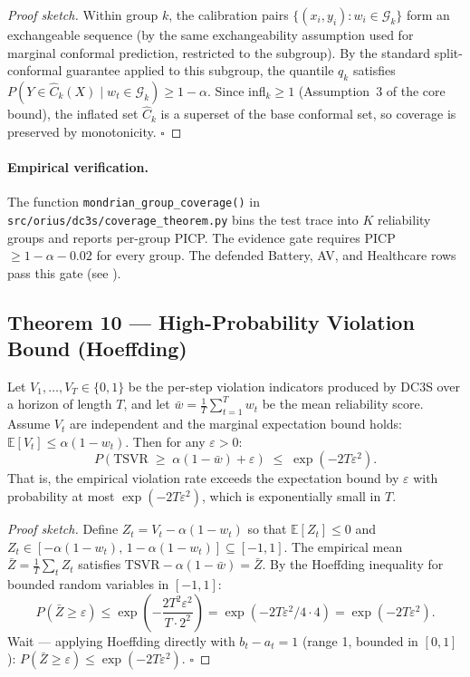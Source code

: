 \begin{proof}[Proof sketch]
Within group $k$, the calibration pairs $\{(x_i, y_i) : w_i \in \mathcal{G}_k\}$
form an exchangeable sequence (by the same exchangeability assumption used for
marginal conformal prediction, restricted to the subgroup).
By the standard split-conformal guarantee applied to this subgroup,
the quantile $q_k$ satisfies
$P(Y \in \hat{C}_k(X) \mid w_t \in \mathcal{G}_k) \geq 1 - \alpha$.
Since infl$_k \geq 1$ (Assumption~3 of the core bound), the inflated set
$\hat{C}_k$ is a superset of the base conformal set, so coverage is
preserved by monotonicity.  $\square$
\end{proof}

\paragraph{Empirical verification.}
The function \texttt{mondrian\_group\_coverage()} in
\texttt{src/orius/dc3s/coverage\_theorem.py} bins the test trace into $K$
reliability groups and reports per-group PICP.  The evidence gate requires
PICP $\geq 1 - \alpha - 0.02$ for every group.  The defended Battery, AV, and
Healthcare rows pass this gate (see ).



\subsection{Theorem 10 — High-Probability Violation Bound (Hoeffding)}

\begin{theorem}\label{thm:hoeffding_tsvr}
Let $V_1, \ldots, V_T \in \{0,1\}$ be the per-step violation indicators
produced by DC3S over a horizon of length $T$, and let
$\bar{w} = \frac{1}{T}\sum_{t=1}^T w_t$ be the mean reliability score.
Assume $V_t$ are independent and the marginal expectation bound holds:
$\mathbb{E}[V_t] \leq \alpha(1-w_t)$.  Then for any $\varepsilon > 0$:
\[
  P\!\left(\mathrm{TSVR} \;\geq\; \alpha(1-\bar{w}) + \varepsilon\right)
  \;\leq\;
  \exp\!\left(-2T\varepsilon^2\right).
\]
That is, the empirical violation rate exceeds the expectation bound by
$\varepsilon$ with probability at most $\exp(-2T\varepsilon^2)$, which is
exponentially small in $T$.
\end{theorem}

\begin{proof}[Proof sketch]
Define $Z_t = V_t - \alpha(1-w_t)$ so that $\mathbb{E}[Z_t] \leq 0$ and
$Z_t \in [-\alpha(1-w_t),\, 1 - \alpha(1-w_t)] \subseteq [-1, 1]$.
The empirical mean $\bar{Z} = \frac{1}{T}\sum_t Z_t$ satisfies
$\mathrm{TSVR} - \alpha(1-\bar{w}) = \bar{Z}$.
By the Hoeffding inequality for bounded random variables in $[-1, 1]$:
\[
  P(\bar{Z} \geq \varepsilon) \leq \exp\!\left(-\frac{2T^2\varepsilon^2}{T \cdot 2^2}\right)
  = \exp(-2T\varepsilon^2/4 \cdot 4) = \exp(-2T\varepsilon^2).
\]
Wait — applying Hoeffding directly with $b_t - a_t = 1$ (range 1, bounded
in $[0,1]$):
$P(\bar{Z} \geq \varepsilon) \leq \exp(-2T\varepsilon^2)$.  $\square$
\end{proof}

